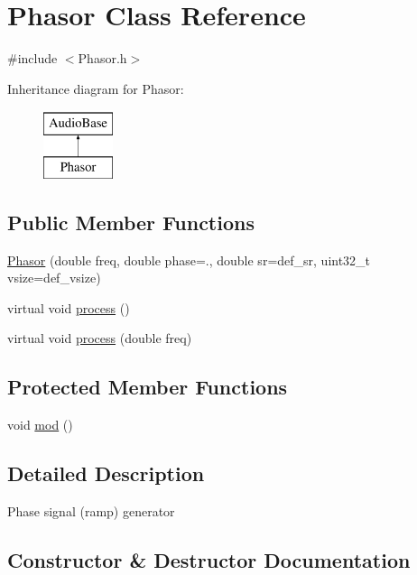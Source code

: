 \hypertarget{class_phasor}{}\section{Phasor Class Reference}
\label{class_phasor}


{\ttfamily \#include $<$Phasor.\+h$>$}

Inheritance diagram for Phasor\+:\begin{figure}[H]
\begin{center}
\leavevmode
\includegraphics[height=2.000000cm]{class_phasor}
\end{center}
\end{figure}
\subsection*{Public Member Functions}
\begin{DoxyCompactItemize}
\item 
\hyperlink{class_phasor_a4522af2664d1a277de86e7a9eb053189}{Phasor} (double freq, double phase=., double sr=def\+\_\+sr, uint32\+\_\+t vsize=def\+\_\+vsize)
\item 
virtual void \hyperlink{class_phasor_abb4f4c04b5ca206ea79b8f9437bb1c33}{process} ()
\item 
virtual void \hyperlink{class_phasor_aa6a31e512e0f60497cc86de4467c33ef}{process} (double freq)
\end{DoxyCompactItemize}
\subsection*{Protected Member Functions}
\begin{DoxyCompactItemize}
\item 
void \hyperlink{class_phasor_a2a8267de2401d912bdd8fc25f2a38eb9}{mod} ()
\end{DoxyCompactItemize}


\subsection{Detailed Description}
Phase signal (ramp) generator 

\subsection{Constructor \& Destructor Documentation}
\mbox{\label{class_phasor_a4522af2664d1a277de86e7a9eb053189}} 
